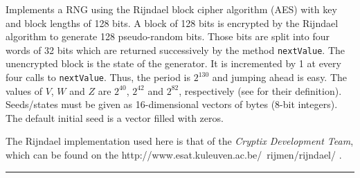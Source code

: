 
Implements a RNG using the Rijndael block cipher algorithm
(AES) with key and block lengths of 128 bits. A block of 128 bits is
encrypted by the Rijndael algorithm to generate 128
pseudo-random bits. Those bits are split into four words of 32 bits which are
returned successively by the method \texttt{nextValue}.
The unencrypted block is the state of the generator.
It is incremented by 1 at every four calls to \texttt{nextValue}.
Thus, the period is $2^{130}$ and jumping ahead is easy.
The values of $V$, $W$ and $Z$ are $2^{40}$, $2^{42}$ and $2^{82}$,
respectively (see  for their definition).
Seeds/states must be given as 16-dimensional
vectors of bytes (8-bit integers).
The default initial seed is a vector filled with zeros.

The Rijndael implementation used here is that of the
\emph{Cryptix Development Team}, which can be found on the
{http://www.esat.kuleuven.ac.be/~rijmen/rijndael/}
.


\bigskip\hrule

